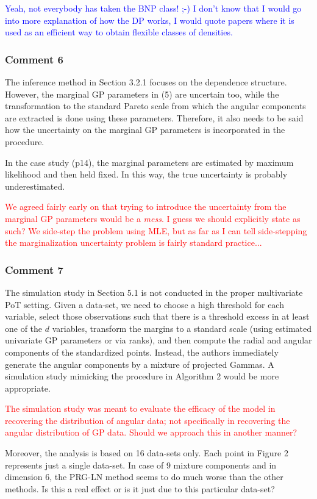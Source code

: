 \documentclass[10pt]{article}
\newcommand{\bruno}[1]{\textcolor{blue}{#1}} %
\newcommand{\peter}[1]{\textcolor{red}{#1}}  %
\begin{document}
\bruno{Yeah, not everybody has taken the BNP class! ;-) I don't know that I would go into more explanation of how the DP works, I would quote papers where it is used as an efficient way to obtain flexible classes of densities. }

\subsubsection*{Comment 6}
The inference method in Section 3.2.1 focuses on the dependence structure. However, the marginal GP parameters in (5) are uncertain too, while the transformation to the standard Pareto scale from which the angular components are extracted is done using these parameters. Therefore, it also needs to be said how the uncertainty on the marginal GP parameters is incorporated in the procedure.  

In the case study (p14), the marginal parameters are estimated by maximum likelihood and then held fixed. In this way, the true uncertainty is probably underestimated.

\peter{We agreed fairly early on that trying to introduce the uncertainty from the marginal GP parameters would be a \emph{mess}.  I guess we should explicitly state as such?  We side-step the problem using MLE, but as far as I can tell side-stepping the marginalization uncertainty problem is fairly standard practice...}

\subsubsection*{Comment 7}
The simulation study in Section 5.1 is not conducted in the proper multivariate PoT setting. Given a data-set, we need to choose a high threshold for each variable, select those observations such that there is a threshold excess in at least one of the $d$ variables, transform the margins to a standard scale (using estimated univariate GP parameters or via ranks), and then compute the radial and angular components of the standardized points. Instead, the authors immediately generate the angular components by a mixture of projected Gammas. A simulation study mimicking the procedure in Algorithm 2 would be more appropriate.

\peter{The simulation study was meant to evaluate the efficacy of the model in recovering the distribution of angular data; not specifically in recovering the angular distribution of GP data.  Should we approach this in another manner?}

Moreover, the analysis is based on 16 data-sets only. Each point in Figure 2 represents just a single data-set. In case of 9 mixture components and in dimension 6, the PRG-LN method seems to do much worse than the other methods. Is this a real effect or is it just due to this particular data-set?
\end{document}
